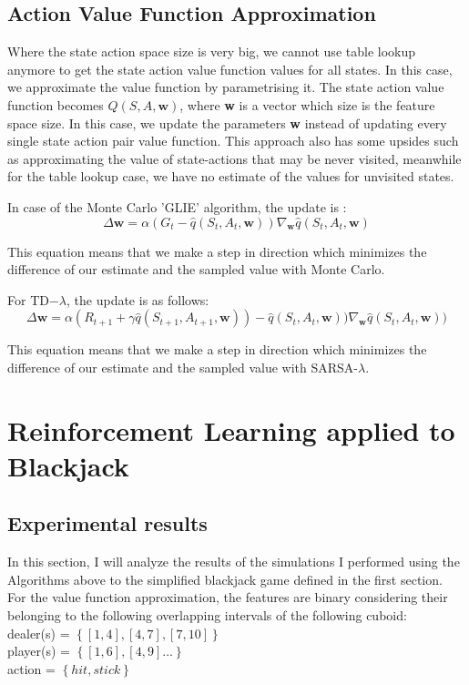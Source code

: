 \documentclass[12pt,a4paper]{article}
\begin{document}
\subsection{Action Value Function Approximation}
Where the state action space size is very big, we cannot use table lookup anymore to get the state action value function values for all states. In this case, we approximate the value function by parametrising it. The state action value function becomes $Q(S, A, \textbf{w})$, where \textbf{w} is a vector which size is the feature space size. In this case, we update the parameters \textbf{w} instead of updating every single state action pair value function. This approach also has some upsides such as approximating the value of state-actions that may be never visited, meanwhile for the table lookup case, we have no estimate of the values for unvisited states.

In case of the Monte Carlo 'GLIE' algorithm, the update is :
\begin{equation}
\Delta \textbf{w}=\alpha (G_{t} - \hat{q}(S_{t}, A_{t}, \textbf{w}) )\nabla_{\textbf{w}}\hat{q}(S_{t}, A_{t}, \textbf{w})
\end{equation}

This equation means that we make a step in direction which minimizes the difference of our estimate and the sampled value with Monte Carlo.

For TD$-\lambda$, the update is as follows:
\begin{equation}
\Delta \textbf{w}=\alpha (R_{t+1} + \gamma \hat{q}(S_{t+1}, A_{t+1}, \textbf{w}) ) - \hat{q}(S_{t}, A_{t}, \textbf{w}) )\nabla_{\textbf{w}}\hat{q}(S_{t}, A_{t}, \textbf{w}) )
\end{equation}


This equation means that we make a step in direction which minimizes the difference of our estimate and the sampled value with SARSA-$\lambda$.

\newpage
\section{Reinforcement Learning applied to Blackjack}

\subsection{Experimental results}


In this section, I will analyze the results of the simulations I performed using the Algorithms above to the simplified blackjack game defined in the first section.
\\For the value function approximation, the features are binary considering their belonging to the following overlapping intervals of the following cuboid:
\\dealer(s) = $\left\lbrace[1, 4], [4, 7], [7, 10]\right\rbrace$
\\player(s) = $\left\lbrace[1, 6], [4, 9] ...\right\rbrace$
\\action = $\left\lbrace hit, stick \right\rbrace$
\end{document}
